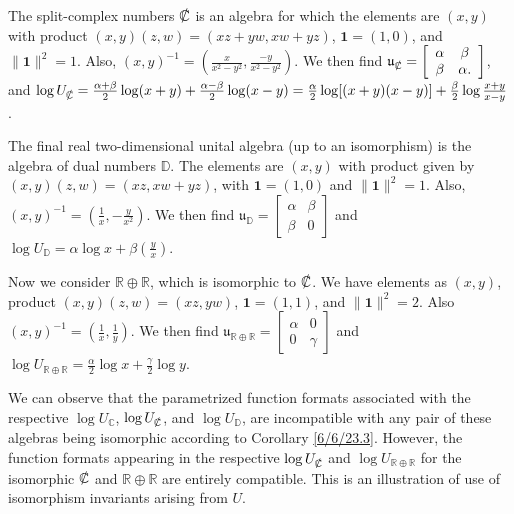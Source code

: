 \documentclass{amsart}
\numberwithin{equation}{section}
\theoremstyle{definition}
\numberwithin{theorem}{section}
\begin{document}
The split-complex numbers $\slashed{\mathbb{C}}$ is an algebra for which the elements are  $(x,y)$ with product $(x,y)(z,w) = (xz+yw,xw+yz)$, $ \mathbf{1} = (1,0)$, and $\|\mathbf{1}\|^2 = 1$.  Also, $(x,y)^{-1} = (\frac{x}{x^2-y^2},\frac{-y}{x^2-y^2})$.  We then find $\mathfrak{u}_{\slashed{\mathbb{C}}} = \left[\begin{array}{ccc}
 \alpha & \beta   \\ 
 \beta & \alpha.    
\end{array}\right]$, and $\log  U_{\slashed{\mathbb{C}}} = \frac{\alpha+\beta}{2}\log(x+y) + \frac{\alpha-\beta}{2}\log(x-y) = \frac{\alpha}{2}\log[(x+
y)(x-y)] +  \frac{\beta}{2}\log \frac{x+y}{x-y}$.

The final real two-dimensional unital algebra (up to an isomorphism) is the algebra of dual numbers $\mathbb{D}$.  The elements are $(x,y)$ with product given by $(x,y)(z,w) = (xz,xw+yz)$, with $\mathbf{1}=(1,0)$ and $\|\mathbf{1}\|^2 = 1$. Also, $(x,y)^{-1} = (\frac{1}{x},-\frac{y}{x^2})$.  We then find $\mathfrak{u}_\mathbb{D} = \left[\begin{array}{ccc}
 \alpha & \beta   \\ 
 \beta & 0    
\end{array}\right]$ and $\log  U_{\mathbb{D}} = \alpha\log x + \beta\left(\frac{y}{x}\right)$.

Now we consider $\mathbb{R}\oplus\mathbb{R}$, which is isomorphic to $\slashed{\mathbb{C}}$.  We have elements as $(x,y)$, product $(x,y)(z,w) = (xz,yw)$, $\mathbf{1}=(1,1)$, and $\|\mathbf{1}\|^2 = 2$.  Also $(x,y)^{-1} = (\frac{1}{x},\frac{1}{y})$.  We then find $\mathfrak{u}_{\mathbb{R}\oplus\mathbb{R}} = \left[\begin{array}{ccc}
 \alpha & 0   \\ 
 0 & \gamma    
\end{array}\right]$ and $\log  U_{\mathbb{R}\oplus\mathbb{R}} = \frac{\alpha}{2}\log x + \frac{\gamma}{2}\log y$.

We can observe that the parametrized function formats associated with the respective $\log U_{\mathbb{C}}$, $\log U_{\slashed{\mathbb{C}}}$, and $\log U_{\mathbb{D}}$, are incompatible with any pair of these algebras being isomorphic according to Corollary \ref{6/6/23.3}.  However, the function formats appearing in the respective $\log U_{\slashed{\mathbb{C}}}$ and $\log U_{\mathbb{R}\oplus\mathbb{R}}$  for the isomorphic $\slashed{\mathbb{C}}$ and $\mathbb{R}\oplus\mathbb{R}$ are entirely compatible.  This is an illustration of use of isomorphism invariants arising from $U$.
\end{document}
